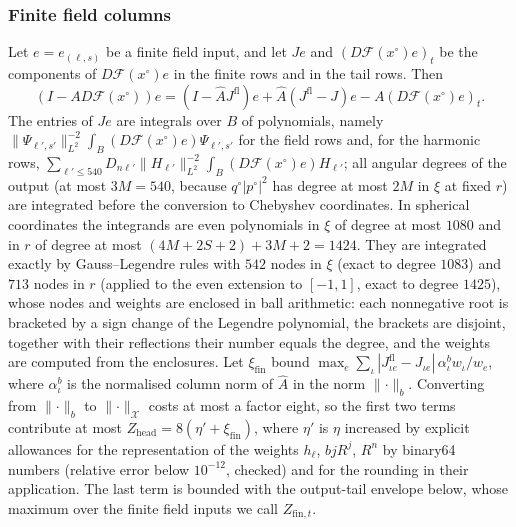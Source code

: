 \documentclass[11pt]{amsart}
\theoremstyle{definition}
\theoremstyle{remark}
\numberwithin{equation}{section}
\newcommand{\Fc}{\mathcal{F}}
\newcommand{\nrm}[1]{\lVert #1\rVert}
\begin{document}
\subsubsection*{Finite field columns}
Let $e=e_{(\ell,s)}$ be a finite field input, and let $Je$ and $(D\Fc(x^\circ)e)_t$ be the components of $D\Fc(x^\circ)e$ in the finite rows and in the tail rows. Then
\[
(I-AD\Fc(x^\circ))e=(I-\widehat AJ^{\mathrm{fl}})e+\widehat A(J^{\mathrm{fl}}-J)e-A(D\Fc(x^\circ)e)_t .
\]
The entries of $Je$ are integrals over $B$ of polynomials, namely $\nrm{\Psi_{\ell',s'}}^{-2}_{L^2}\int_B(D\Fc(x^\circ)e)\Psi_{\ell',s'}$ for the field rows and, for the harmonic rows, $\sum_{\ell'\leq540}D_{n\ell'}\nrm{H_{\ell'}}^{-2}_{L^2}\int_B(D\Fc(x^\circ)e)H_{\ell'}$; all angular degrees of the output (at most $3M=540$, because $q^\circ|p^\circ|^2$ has degree at most $2M$ in $\xi$ at fixed $r$) are integrated before the conversion to Chebyshev coordinates. In spherical coordinates the integrands are even polynomials in $\xi$ of degree at most $1080$ and in $r$ of degree at most $(4M+2S+2)+3M+2=1424$. They are integrated exactly by Gauss--Legendre rules with $542$ nodes in $\xi$ (exact to degree $1083$) and $713$ nodes in $r$ (applied to the even extension to $[-1,1]$, exact to degree $1425$), whose nodes and weights are enclosed in ball arithmetic: each nonnegative root is bracketed by a sign change of the Legendre polynomial, the brackets are disjoint, together with their reflections their number equals the degree, and the weights are computed from the enclosures. Let $\xi_{\mathrm{fin}}$ bound $\max_e\sum_\iota|J^{\mathrm{fl}}_{\iota e}-J_{\iota e}|\,\alpha^b_\iota w_\iota/w_e$, where $\alpha^b_\iota$ is the normalised column norm of $\widehat A$ in the norm $\nrm\cdot_b$. Converting from $\nrm\cdot_b$ to $\nrm\cdot_{\mathcal X}$ costs at most a factor eight, so the first two terms contribute at most $Z_{\mathrm{head}}=8(\eta'+\xi_{\mathrm{fin}})$, where $\eta'$ is $\eta$ increased by explicit allowances for the representation of the weights $h_\ell$, $bjR^j$, $R^n$ by binary64 numbers (relative error below $10^{-12}$, checked) and for the rounding in their application. The last term is bounded with the output-tail envelope below, whose maximum over the finite field inputs we call $Z_{\mathrm{fin},t}$.
\end{document}
